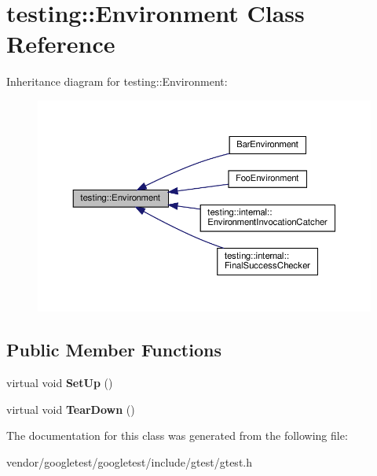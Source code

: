 \hypertarget{classtesting_1_1_environment}{}\section{testing\+:\+:Environment Class Reference}
\label{classtesting_1_1_environment}


Inheritance diagram for testing\+:\+:Environment\+:
\nopagebreak
\begin{figure}[H]
\begin{center}
\leavevmode
\includegraphics[width=350pt]{classtesting_1_1_environment__inherit__graph}
\end{center}
\end{figure}
\subsection*{Public Member Functions}
\begin{DoxyCompactItemize}
\item 
\mbox{\label{classtesting_1_1_environment_a1bf8cafaa9d4eba9feb98655ee434eb3}} 
virtual void {\bfseries Set\+Up} ()
\item 
\mbox{\label{classtesting_1_1_environment_a039bdaa705c46b9b88234cf4d3bb6254}} 
virtual void {\bfseries Tear\+Down} ()
\end{DoxyCompactItemize}


The documentation for this class was generated from the following file\+:\begin{DoxyCompactItemize}
\item 
vendor/googletest/googletest/include/gtest/gtest.\+h\end{DoxyCompactItemize}

